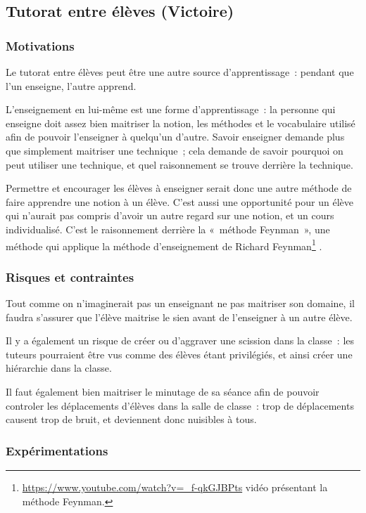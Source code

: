 \subsection{Tutorat entre élèves (Victoire)}
\subsubsection{Motivations}
Le tutorat entre élèves peut être une autre source d'apprentissage : pendant que
l'un enseigne, l'autre apprend.

L'enseignement en lui-même est une forme d'apprentissage : la personne qui
enseigne doit assez bien maitriser la notion, les méthodes et le vocabulaire
utilisé afin de pouvoir l'enseigner à quelqu'un d'autre. Savoir enseigner
demande plus que simplement maitriser une technique ; cela demande de savoir
pourquoi on peut utiliser une technique, et quel raisonnement se trouve derrière
la technique.

Permettre et encourager les élèves à enseigner serait donc une autre méthode de
faire apprendre une notion à un élève. C'est aussi une opportunité pour un élève
qui n'aurait pas compris d'avoir un autre regard sur une notion, et un cours
individualisé. C'est le raisonnement derrière la « méthode Feynman », une méthode
qui applique la méthode d'enseignement de Richard Feynman\footnote{\url{https://www.youtube.com/watch?v=_f-qkGJBPts} vidéo présentant la méthode Feynman.}
.
\subsubsection{Risques et contraintes}

Tout comme on n'imaginerait pas un enseignant ne pas maitriser son domaine, il
faudra s'assurer que l'élève maitrise le sien avant de l'enseigner à un autre
élève.

Il y a également un risque de créer ou d'aggraver une scission dans la classe :
les tuteurs pourraient être vus comme des élèves étant privilégiés, et ainsi créer
une hiérarchie dans la classe.\cite{pedagogie_cooperative_hierarchie}

Il faut également bien maitriser le minutage de sa séance afin de pouvoir controler
les déplacements d'élèves dans la salle de classe : trop de déplacements causent
trop de bruit, et deviennent donc nuisibles à tous.

\subsubsection{Expérimentations}

